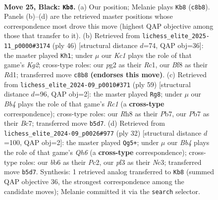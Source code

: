 \documentclass[11pt]{article}
\begin{document}
\clearpage

\begin{figure}[p]\centering
\begin{subfigure}{0.46\textwidth}\centering
\resizebox{\linewidth}{!}{%
\newchessgame
\chessboard[
  setfen={2k2b1r/1p2pp1n/rB1p2p1/1b6/3PP1Q1/1P2RP2/6PP/1K5R b - - 3 25},
  showmover=false,
  pgfstyle=straightmove, color=movearrow, markmove={c8-b8}
]}
\caption{}
\end{subfigure}\hfill
\begin{subfigure}{0.46\textwidth}\centering
\resizebox{\linewidth}{!}{%
\newchessgame
\chessboard[
  setfen={1r3k1r/5ppp/Q1B1pb2/1p2p3/1P4q1/P3P3/5PKP/2RR4 w - - 4 24},
  showmover=false,
  pgfstyle=straightmove, color=movearrow, markmove={g2-h1}
]}
\caption{}
\end{subfigure}
\\[4pt]
\begin{subfigure}{0.46\textwidth}\centering
\resizebox{\linewidth}{!}{%
\newchessgame
\chessboard[
  setfen={2r5/1pb3pk/3r1p1p/p3pP1N/b3P3/3P1R1P/1P4PK/4Q3 b - - 5 30},
  showmover=false,
  pgfstyle=straightmove, color=movearrow, markmove={c8-g8}
]}
\caption{}
\end{subfigure}\hfill
\begin{subfigure}{0.46\textwidth}\centering
\resizebox{\linewidth}{!}{%
\newchessgame
\chessboard[
  setfen={r1b2rk1/ppp2p2/4p2Q/2q2p2/8/2NB4/PPP3PP/3R3K w - - 0 17},
  showmover=false,
  pgfstyle=straightmove, color=movearrow, markmove={h6-g5}
]}
\caption{}
\end{subfigure}
\caption{\textbf{Move 25, Black: \texttt{Kb8}.} (a) Our position; Melanie plays \texttt{Kb8} (\texttt{c8b8}). Panels (b)--(d) are the retrieved master positions whose correspondence most drove this move (highest QAP objective among those that transfer to it). (b) Retrieved from \texttt{lichess\_elite\_2025-11\_p0000\#3174} (ply 46) [structural distance $d$=74, QAP obj=36]: the master played \texttt{Kh1}; under $\mu$ our \emph{Kc1} plays the role of that game's \emph{Kg2}; cross-type roles: our \emph{p}g2 as their \emph{R}c1, our \emph{B}f8 as their \emph{R}d1; transferred move \texttt{c8b8} \textbf{(endorses this move)}. (c) Retrieved from \texttt{lichess\_elite\_2024-09\_p0010\#371} (ply 59) [structural distance $d$=96, QAP obj=2]: the master played \texttt{Rg8}; under $\mu$ our \emph{Bb4} plays the role of that game's \emph{Rc1} (a \textbf{cross-type} correspondence); cross-type roles: our \emph{R}h8 as their \emph{P}b7, our \emph{P}b7 as their \emph{B}c7; transferred move \texttt{b5d7}. (d) Retrieved from \texttt{lichess\_elite\_2024-09\_p0026\#977} (ply 32) [structural distance $d$=100, QAP obj=2]: the master played \texttt{Qg5+}; under $\mu$ our \emph{Bb4} plays the role of that game's \emph{Qh6} (a \textbf{cross-type} correspondence); cross-type roles: our \emph{b}b6 as their \emph{P}c2, our \emph{p}f3 as their \emph{N}c3; transferred move \texttt{b5d7}. Synthesis: 1 retrieved analog transferred to \texttt{Kb8} (summed QAP objective 36, the strongest correspondence among the candidate moves); Melanie committed it via the \texttt{search} selector.}
\label{fig:thought-m49}
\end{figure}
\end{document}
